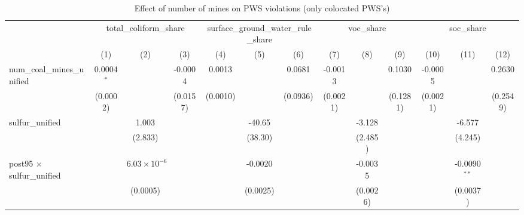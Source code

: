 
\begin{table}[htbp]
   \caption{\label{olsrf2sls_nummine_non_mine_vio_1985to2005colocate_coalunified} Effect of number of mines on PWS violations (only colocated PWS's)}
   \bigskip
   \centering
   \begin{adjustbox}{width = \textwidth, center}
      \begin{tabular}{lcccccccccccc}
         \toprule
          & \multicolumn{3}{c}{total\_coliform\_share} & \multicolumn{3}{c}{surface\_ground\_water\_rule\_share} & \multicolumn{3}{c}{voc\_share} & \multicolumn{3}{c}{soc\_share}\\
                                                          & (1)           & (2)                   & (3)           & (4)           & (5)           & (6)           & (7)           & (8)           & (9)           & (10)                  & (11)           & (12)\\  
         \midrule 
         num\_coal\_mines\_unified                        & 0.0004$^{*}$  &                       & -0.0004       & 0.0013        &               & 0.0681        & -0.0013       &               & 0.1030        & -0.0005               &                & 0.2630\\   
                                                          & (0.0002)      &                       & (0.0157)      & (0.0010)      &               & (0.0936)      & (0.0021)      &               & (0.1281)      & (0.0021)              &                & (0.2549)\\   
         sulfur\_unified                                  &               & 1.003                 &               &               & -40.65        &               &               & -3.128        &               &                       & -6.577         &   \\   
                                                          &               & (2.833)               &               &               & (38.30)       &               &               & (2.485)       &               &                       & (4.245)        &   \\   
         post95 $\times$ sulfur\_unified                  &               & $6.03\times 10^{-6}$  &               &               & -0.0020       &               &               & -0.0035       &               &                       & -0.0090$^{**}$ &   \\   
                                                          &               & (0.0005)              &               &               & (0.0025)      &               &               & (0.0026)      &               &                       & (0.0037)       &   \\   

\end{tabular}
\end{adjustbox}
\end{table}

